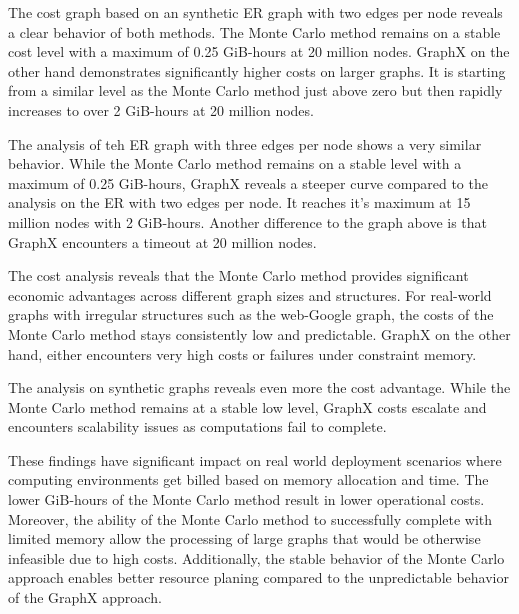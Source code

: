 The cost graph based on an synthetic ER graph with two edges per node reveals a clear behavior of both methods. The Monte Carlo method remains on a stable cost level with a maximum of 0.25 GiB-hours at 20 million nodes. GraphX on the other hand demonstrates significantly higher costs on larger graphs. It is starting from a similar level as the Monte Carlo method just above zero but then rapidly increases to over 2 GiB-hours at 20 million nodes.\par
The analysis of teh ER graph with three edges per node shows a very similar behavior. While the Monte Carlo method remains on a stable level with a maximum of 0.25 GiB-hours, GraphX reveals a steeper curve compared to the analysis on the ER with two edges per node. It reaches it's maximum at 15 million nodes with 2 GiB-hours. Another difference to the graph above is that GraphX encounters a timeout at 20 million nodes. \par
The cost analysis reveals that the Monte Carlo method provides significant economic advantages across different graph sizes and structures. 
For real-world graphs with irregular structures such as the web-Google graph, the costs of the Monte Carlo method stays consistently low and predictable. GraphX on the other hand, either encounters very high costs or failures under constraint memory.\par
The analysis on synthetic graphs reveals even more the cost advantage. While the Monte Carlo method remains at a stable low level, GraphX costs escalate and encounters scalability issues as computations fail to complete. \par
These findings have significant impact on real world deployment scenarios where computing environments get billed based on memory allocation and time. The lower GiB-hours of the Monte Carlo method result in lower operational costs. Moreover, the ability of the Monte Carlo method to successfully complete with limited memory allow the processing of large graphs that would be otherwise infeasible due to high costs. Additionally, the stable behavior of the Monte Carlo approach enables better resource planing compared to the unpredictable behavior of the GraphX approach.


